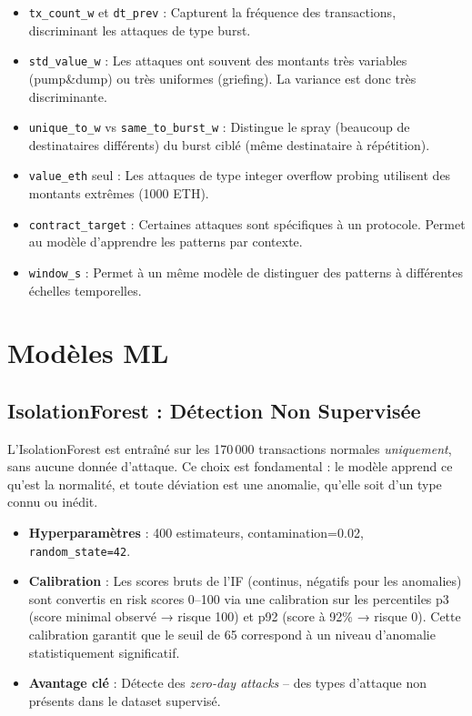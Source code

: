 \documentclass[12pt,a4paper]{report}
\newcommand{\code}[1]{\texttt{#1}}
\begin{document}
\begin{itemize}
  \item \code{tx\_count\_w} et \code{dt\_prev} : Capturent la fréquence des transactions, discriminant les attaques de type burst.
  \item \code{std\_value\_w} : Les attaques ont souvent des montants très variables (pump\&dump) ou très uniformes (griefing). La variance est donc très discriminante.
  \item \code{unique\_to\_w} vs \code{same\_to\_burst\_w} : Distingue le spray (beaucoup de destinataires différents) du burst ciblé (même destinataire à répétition).
  \item \code{value\_eth} seul : Les attaques de type integer overflow probing utilisent des montants extrêmes (1000 ETH).
  \item \code{contract\_target} : Certaines attaques sont spécifiques à un protocole. Permet au modèle d'apprendre les patterns par contexte.
  \item \code{window\_s} : Permet à un même modèle de distinguer des patterns à différentes échelles temporelles.
\end{itemize}

\section{Modèles ML}

\subsection{IsolationForest : Détection Non Supervisée}

L'IsolationForest est entraîné sur les 170\,000 transactions normales \textit{uniquement}, sans aucune donnée d'attaque. Ce choix est fondamental : le modèle apprend ce qu'est la normalité, et toute déviation est une anomalie, qu'elle soit d'un type connu ou inédit.

\begin{itemize}
  \item \textbf{Hyperparamètres} : 400 estimateurs, contamination=0.02, \code{random\_state=42}.
  \item \textbf{Calibration} : Les scores bruts de l'IF (continus, négatifs pour les anomalies) sont convertis en risk scores 0--100 via une calibration sur les percentiles p3 (score minimal observé → risque 100) et p92 (score à 92\% → risque 0). Cette calibration garantit que le seuil de 65 correspond à un niveau d'anomalie statistiquement significatif.
  \item \textbf{Avantage clé} : Détecte des \textit{zero-day attacks} -- des types d'attaque non présents dans le dataset supervisé.
\end{itemize}
\end{document}
